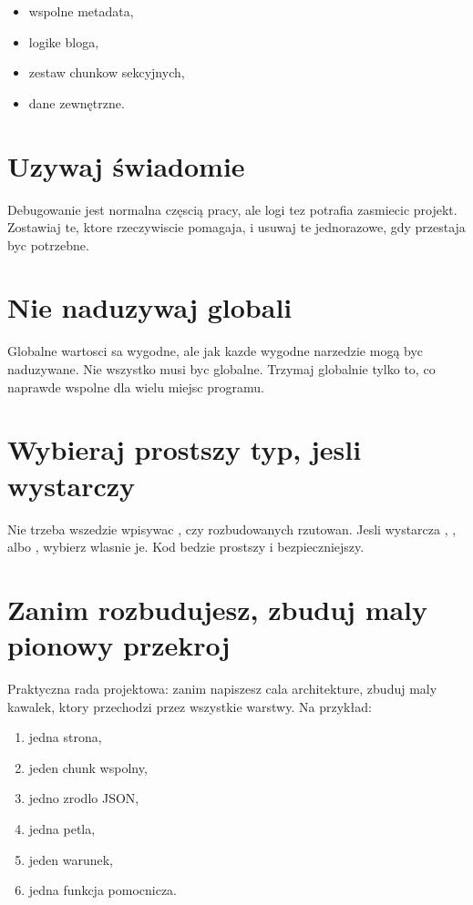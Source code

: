 \begin{itemize}
  \item wspolne metadata,
  \item logike bloga,
  \item zestaw chunkow sekcyjnych,
  \item dane zewnętrzne.
\end{itemize}

\section{Uzywaj  świadomie}
Debugowanie jest normalna częscią pracy, ale logi tez potrafia zasmiecic projekt.
Zostawiaj te, ktore rzeczywiscie pomagaja, i usuwaj te jednorazowe, gdy przestaja byc
potrzebne.

\section{Nie naduzywaj globali}
Globalne wartosci sa wygodne, ale jak kazde wygodne narzedzie mogą byc naduzywane.
Nie wszystko musi byc globalne. Trzymaj globalnie tylko to, co naprawde wspolne dla
wielu miejsc programu.

\section{Wybieraj prostszy typ, jesli wystarczy}
Nie trzeba wszedzie wpisywac ,  czy rozbudowanych rzutowan. Jesli
wystarcza , ,  albo , wybierz wlasnie je.
Kod bedzie prostszy i bezpieczniejszy.

\section{Zanim rozbudujesz, zbuduj maly pionowy przekroj}
Praktyczna rada projektowa: zanim napiszesz cala architekture, zbuduj maly kawalek,
ktory przechodzi przez wszystkie warstwy. Na przykład:

\begin{enumerate}
  \item jedna strona,
  \item jeden chunk wspolny,
  \item jedno zrodlo JSON,
  \item jedna petla,
  \item jeden warunek,
  \item jedna funkcja pomocnicza.
\end{enumerate}

